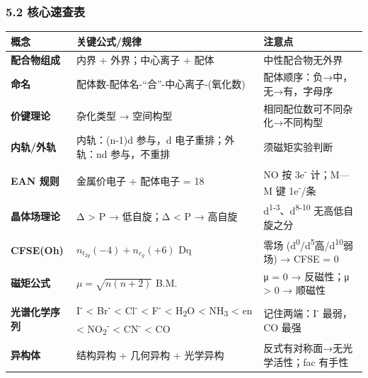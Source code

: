 \subsubsection{5.2 核心速查表}\label{ux6838ux5fc3ux901fux67e5ux8868}

{\def\LTcaptype{none} %
\begin{longtable}[]{@{}
  >{\raggedright\arraybackslash}p{}
  >{\raggedright\arraybackslash}p{}
  >{\raggedright\arraybackslash}p{}@{}}
\toprule\noalign{}
\begin{minipage}[b]{\linewidth}\raggedright
概念
\end{minipage} & \begin{minipage}[b]{\linewidth}\raggedright
关键公式/规律
\end{minipage} & \begin{minipage}[b]{\linewidth}\raggedright
注意点
\end{minipage} \\
\midrule\noalign{}
\endhead
\bottomrule\noalign{}
\endlastfoot
\textbf{配合物组成} & 内界 + 外界；中心离子 + 配体 & 中性配合物无外界 \\
\textbf{命名} & 配体数-配体名-``合''-中心离子-(氧化数) & 配体顺序：负→中，无→有，字母序 \\
\textbf{价键理论} & 杂化类型 → 空间构型 & 相同配位数可不同杂化→不同构型 \\
\textbf{内轨/外轨} & 内轨：(n-1)d 参与，d 电子重排；外轨：nd 参与，不重排 & 须磁矩实验判断 \\
\textbf{EAN 规则} & 金属价电子 + 配体电子 = 18 & NO 按 3e\textsuperscript{-} 计；M---M 键 1e\textsuperscript{-}/条 \\
\textbf{晶体场理论} & Δ \textgreater{} P → 低自旋；Δ \textless{} P → 高自旋 & d\textsuperscript{1-3}、d\textsuperscript{8-10} 无高低自旋之分 \\
\textbf{CFSE(Oh)} & \(n_{t_{2g}}(-4) + n_{e_g}(+6)\) Dq & 零场 (d\textsuperscript{0}/d\textsuperscript{5}高/d\textsuperscript{10}弱场) → CFSE = 0 \\
\textbf{磁矩公式} & \(\mu = \sqrt{n(n+2)}\) B.M. & μ = 0 → 反磁性；μ \textgreater{} 0 → 顺磁性 \\
\textbf{光谱化学序列} & I\textsuperscript{-} \textless{} Br\textsuperscript{-} \textless{} Cl\textsuperscript{-} \textless{} F\textsuperscript{-} \textless{} H\textsubscript{2}O \textless{} NH\textsubscript{3} \textless{} en \textless{} NO\textsubscript{2}\textsuperscript{-} \textless{} CN\textsuperscript{-} \textless{} CO & 记住两端：I\textsuperscript{-} 最弱，CO 最强 \\
\textbf{异构体} & 结构异构 + 几何异构 + 光学异构 & 反式有对称面→无光学活性；fac 有手性 \\
\end{longtable}
}

